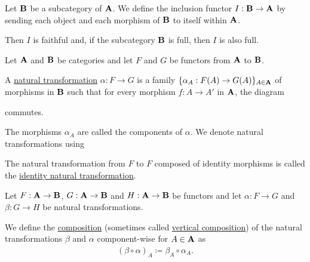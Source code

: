 \begin{example}\label{def:subcategory_functors}\cite[25]{Leinster2014}
  Let $\operatorname{\mathbf{B}}$ be a subcategory of $\operatorname{\mathbf{A}}$. We define the inclusion functor $I: \operatorname{\mathbf{B}} \to \operatorname{\mathbf{A}}$ by sending each object and each morphism of $\operatorname{\mathbf{B}}$ to itself within $\operatorname{\mathbf{A}}$.

  Then $I$ is faithful and, if the subcategory $\operatorname{\mathbf{B}}$ is full, then $I$ is also full.
\end{example}

\begin{definition}\label{def:natural_transformation}\cite[definition 1.3.1]{Leinster2014}
  Let $\operatorname{\mathbf{A}}$ and $\operatorname{\mathbf{B}}$ be categories and let $F$ and $G$ be functors from $\operatorname{\mathbf{A}}$ to $\operatorname{\mathbf{B}}$.

  A \uline{natural transformation} $\alpha: F \to G$ is a family $\{ \alpha_A: F(A) \to G(A) \}_{A \in \operatorname{\mathbf{A}}}$ of morphisms in $\operatorname{\mathbf{B}}$ such that for every morphism $f: A \to A'$ in $\operatorname{\mathbf{A}}$, the diagram
  \begin{center}
  \end{center}
  commutes.

  The morphisms $\alpha_A$ are called the components of $\alpha$. We denote natural transformations using
  \begin{center}
  \end{center}

  The natural transformation from $F$ to $F$ composed of identity morphisms is called the \uline{identity natural transformation}.
\end{definition}

\begin{definition}\label{def:natural_transformation_composition}
  Let $F: \operatorname{\mathbf{A}} \to \operatorname{\mathbf{B}}$, $G: \operatorname{\mathbf{A}} \to \operatorname{\mathbf{B}}$ and $H: \operatorname{\mathbf{A}} \to \operatorname{\mathbf{B}}$ be functors and let $\alpha: F \to G$ and $\beta: G \to H$ be natural transformations.

  We define the \uline{composition} (sometimes called \uline{vertical composition}) of the natural transformations $\beta$ and $\alpha$ component-wise for $A \in \operatorname{\mathbf{A}}$ as
  \begin{align*}
    (\beta \circ \alpha)_A \coloneqq \beta_{A} \circ \alpha_A.
  \end{align*}
\end{definition}

